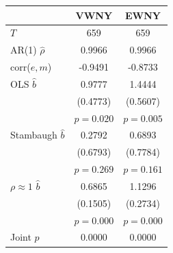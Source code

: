 \begin{tabular}{lcc}
\toprule
 & VWNY & EWNY \\
\midrule
$T$ & 659 & 659 \\
AR(1) $\hat\rho$ & 0.9966 & 0.9966 \\
corr($e,m$) & -0.9491 & -0.8733 \\
\midrule
OLS $\hat b$ & 0.9777 & 1.4444 \\
 & (0.4773) & (0.5607) \\
 & $p=0.020$ & $p=0.005$ \\
Stambaugh $\hat b$ & 0.2792 & 0.6893 \\
 & (0.6793) & (0.7784) \\
 & $p=0.269$ & $p=0.161$ \\
$\rho\approx1$ $\hat b$ & 0.6865 & 1.1296 \\
 & (0.1505) & (0.2734) \\
 & $p=0.000$ & $p=0.000$ \\
\midrule
Joint $p$ & 0.0000 & 0.0000 \\
\bottomrule
\end{tabular}
